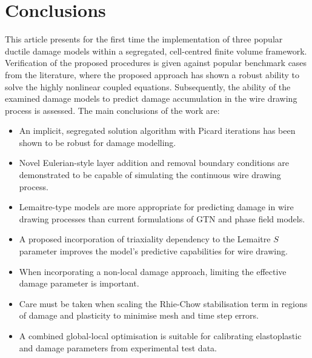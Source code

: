 \documentclass[sn-mathphys,Numbered]{sn-jnl}%
\begin{document}
%






\section{Conclusions} \label{sec:conclusion}
This article presents for the first time the implementation of three popular ductile damage models within a segregated, cell-centred finite volume framework.
Verification of the proposed procedures is given against popular benchmark cases from the literature, where the proposed approach has shown a robust ability to solve the highly nonlinear coupled equations.
Subsequently, the ability of the examined damage models to predict damage accumulation in the wire drawing process is assessed.
The main conclusions of the work are:
\begin{itemize}
	\item An implicit, segregated solution algorithm with Picard iterations has been shown to be robust for damage modelling.
	\item Novel Eulerian-style layer addition and removal boundary conditions are demonstrated to be capable of simulating the continuous wire drawing process.
	\item Lemaitre-type models are more appropriate for predicting damage in wire drawing processes than current formulations of GTN and phase field models.
	\item A proposed incorporation of triaxiality dependency to the Lemaitre $S$ parameter improves the model's predictive capabilities for wire drawing.
	\item When incorporating a non-local damage approach, limiting the effective damage parameter is important.
	\item Care must be taken when scaling the Rhie-Chow stabilisation term in regions of damage and plasticity to minimise mesh and time step errors.
	\item A combined global-local optimisation is suitable for calibrating elastoplastic and damage parameters from experimental test data.
\end{itemize}
\end{document}
